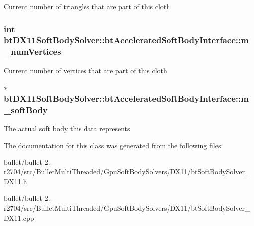 Current number of triangles that are part of this cloth \hypertarget{classbt_d_x11_soft_body_solver_1_1bt_accelerated_soft_body_interface_a72b2382d4a25c7d3124b468963b60671}{
\subsubsection[{m\+\_\+num\+Vertices}]{\setlength{\rightskip}{0pt plus 5cm}int bt\+D\+X11\+Soft\+Body\+Solver\+::bt\+Accelerated\+Soft\+Body\+Interface\+::m\+\_\+num\+Vertices\hspace{0.3cm}{\ttfamily [protected]}}}\label{classbt_d_x11_soft_body_solver_1_1bt_accelerated_soft_body_interface_a72b2382d4a25c7d3124b468963b60671}
Current number of vertices that are part of this cloth \hypertarget{classbt_d_x11_soft_body_solver_1_1bt_accelerated_soft_body_interface_a27dde0294582c35f9ccab253d2f0dc5d}{
\subsubsection[{m\+\_\+soft\+Body}]{$\ast$ bt\+D\+X11\+Soft\+Body\+Solver\+::bt\+Accelerated\+Soft\+Body\+Interface\+::m\+\_\+soft\+Body\hspace{0.3cm}{\ttfamily [protected]}}}\label{classbt_d_x11_soft_body_solver_1_1bt_accelerated_soft_body_interface_a27dde0294582c35f9ccab253d2f0dc5d}
The actual soft body this data represents 

The documentation for this class was generated from the following files\+:\begin{DoxyCompactItemize}
\item 
bullet/bullet-\/2.-\/r2704/src/\+Bullet\+Multi\+Threaded/\+Gpu\+Soft\+Body\+Solvers/\+D\+X11/bt\+Soft\+Body\+Solver\+\_\+\+D\+X11.\+h\item 
bullet/bullet-\/2.-\/r2704/src/\+Bullet\+Multi\+Threaded/\+Gpu\+Soft\+Body\+Solvers/\+D\+X11/bt\+Soft\+Body\+Solver\+\_\+\+D\+X11.\+cpp\end{DoxyCompactItemize}
